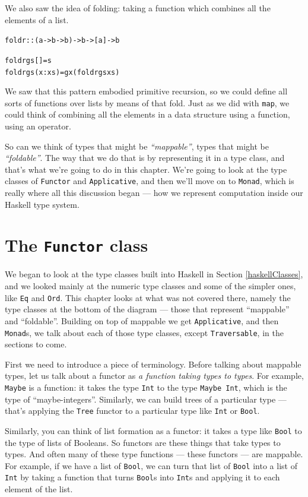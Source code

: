 We also saw the idea of folding: taking a function which combines all the elements of a list.
\begin{alltt}
foldr :: (a -> b -> b) -> b -> [a] -> b

foldr g s []     = s
foldr g s (x:xs) = g x (foldr g s xs)   
\end{alltt}
We saw that this pattern embodied primitive recursion, so we could define all sorts of functions over lists by means of that fold. Just as we did with \texttt{map}, we could think of combining all the elements in a data structure using a function, using an operator. 

So can we think of types that might be \emph{``mappable''}, types that might be \emph{``foldable''}. The way that we do that is by representing it in a type class, and that's what we're going to do in this chapter. We're going to look at the type classes of \texttt{Functor} and \texttt{Applicative}, and then we'll move on to \texttt{Monad}, which is really where all this discussion began — how we represent computation inside our Haskell type system.

\section{The \texttt{Functor} class}

We began to look at the type classes built into Haskell in Section \ref{haskellClasses}, and we looked mainly at the numeric type classes and some of the simpler ones, like \texttt{Eq} and \texttt{Ord}. This chapter looks at what was not covered there, namely the type classes at the bottom of the diagram — those that represent ``mappable'' and ``foldable''. Building on top of mappable we get \texttt{Applicative}, and then \texttt{Monad}s, we talk about each of those type classes, except \texttt{Traversable}, in the sections to come.

First we need to introduce a piece of terminology. Before talking about mappable types, let us talk about a functor as \emph{a function taking types to types}. For example, \texttt{Maybe} is a function: it takes the type \texttt{Int} to the type \texttt{Maybe Int}, which is the type of ``maybe-integers''. Similarly, we can build trees of a particular type — that's applying the \texttt{Tree} functor to a particular type like \texttt{Int} or \texttt{Bool}.

Similarly, you can think of list formation as a functor: it takes a type like \texttt{Bool} to the type of lists of Booleans. So functors are these things that take types to types. And often many of these type functions — these functors — are mappable. For example,  if we have a list of \texttt{Bool}, we can turn that list of \texttt{Bool} into a list of \texttt{Int} by taking a function that turns \texttt{Bool}s into \texttt{Int}s and applying it to each element of the list.

